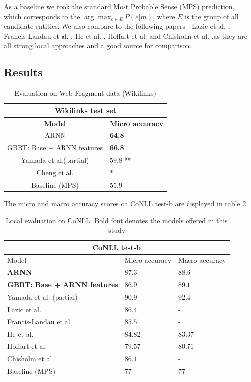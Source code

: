 \documentclass[11pt]{article}
\begin{document}
As a baseline we took the standard Most Probable Sense (MPS) prediction, which corresponds to the $\arg\max_{e\in{{E}}}{P(e|m)}$, where $E$ is the group of all candidate entities.
We also compare to the following papers - Lazic et al. , Francis-Landau et al. , He et al. , Hoffart et al.  and Chisholm et al.  ,as they are all strong local approaches and a good source for comparison.
	
\subsection{Results}

\begin{table}[h]
	\begin{center}
		\begin{tabular}{|c| p{1.5cm}|}
			\hline \multicolumn{2}{|c|}{Wikilinks test set} \\
			\hline \bf Model & \bf Micro     accuracy  \\ \hline
			ARNN  &  \bf64.8\\
			GBRT: Base + ARNN features & \bf 66.8 \\
			Yamada et al.(partial) & $59.8$ ** \\
			Cheng et al. & * \\ 
			Baseline (MPS) & $55.9$ \\
			\hline
		\end{tabular}
	\end{center}
	\caption{\label{tab:b} Evaluation on Web-Fragment data (Wikilinks)}
\end{table}

The micro and macro accuracy scores on CoNLL test-b are displayed in table \ref{tab:a}. 

	
\begin{table}[h]
	\begin{center}
		\begin{tabular}{|p{3.5cm}| p{1.5cm} p{1.5cm}|}
			\hline \multicolumn{3}{|c|}{CoNLL test-b} \\
			\hline Model & Micro     accuracy & Macro     accuracy \\ \hline
			\bf ARNN  & \bf $87.3$ & \bf $88.6$ \\
			\bf GBRT: Base + ARNN features & \bf $86.9$ & \bf $89.1$ \\
			Yamada et al. (partial) & $90.9$ & $92.4$ \\
			Lazic et al. & $86.4$ & - \\
			Francis-Landau et al. & $85.5$ & - \\
			He et al. & 84.82 & $83.37$ \\	
			Hoffart et al. & $79.57$ & $80.71$ \\
			Chisholm et al. & $86.1$ & - \\			
			Baseline (MPS) & $77$ & $77$ \\
			\hline
		\end{tabular}
	\end{center}
	\caption{\label{tab:a} Local evaluation on CoNLL. Bold font denotes the models offered in this study}
\end{table}
\end{document}
